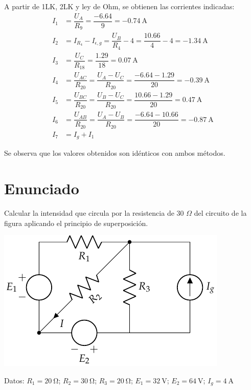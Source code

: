      A partir de 1LK, 2LK y ley de Ohm, se obtienen las corrientes
     indicadas:
     \begin{align*}
       I_1&=\dfrac{U_A}{R_9}=\dfrac{-6.64}{9}=\qty{-0.74}{\ampere}\\[7pt]
       I_2&= I_{R_4}-I_{\epsilon,g}=\dfrac{U_B}{R_4}-4=\dfrac{10.66}{4}-4=\qty{-1.34}{\ampere}\\[7pt]
       I_3&=\dfrac{U_C}{R_{18}}=\dfrac{1.29}{18}=\qty{0.07}{\ampere}\\[7pt]
       I_4&=\dfrac{U_{AC}}{R_{20}}=\dfrac{U_A-U_C}{R_{20}}=\dfrac{-6.64-1.29}{20}=\qty{-0.39}{\ampere}\\[7pt]
       I_5&=\dfrac{U_{BC}}{R_{20}}=\dfrac{U_B-U_C}{R_{20}}=\dfrac{10.66-1.29}{20}=\qty{0.47}{\ampere}\\[7pt]
       I_6&=\dfrac{U_{AB}}{R_{20}}=\dfrac{U_A-U_B}{R_{20}}=\dfrac{-6.64-10.66}{20}=\qty{-0.87}{\ampere}\\[7pt]
       I_7&=I_g+I_1
     \end{align*}

     Se observa que los valores obtenidos son idénticos con ambos
     métodos.
     \section{Enunciado}
     Calcular la intensidad que circula por la resistencia de 30
     $\Omega$ del circuito de la figura aplicando el principio de
     superposición.

\begin{center}
  \includegraphics{figuras/BT1_16.pdf}
\end{center}

  Datos: $R_1 = \qty{20}{\ohm}$; $R_2 = \qty{30}{\ohm}$; $R_3 = \qty{20}{\ohm}$; $E_1 = \qty{32}{\volt}$; $E_2 = \qty{64}{\volt}$; $I_g = \qty{4}{\ampere}$

